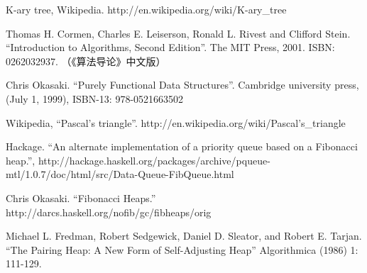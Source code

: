 \documentclass{ctexart}
\begin{document}

\ifx\wholebook\relax \else
\begin{thebibliography}{99}

K-ary tree, Wikipedia. http://en.wikipedia.org/wiki/K-ary\_tree

Thomas H. Cormen, Charles E. Leiserson, Ronald L. Rivest and Clifford Stein. ``Introduction to Algorithms, Second Edition''. The MIT Press, 2001. ISBN: 0262032937. （《算法导论》中文版）

Chris Okasaki. ``Purely Functional Data Structures''. Cambridge university press, (July 1, 1999), ISBN-13: 978-0521663502

Wikipedia, ``Pascal's triangle''. http://en.wikipedia.org/wiki/Pascal's\_triangle

Hackage. ``An alternate implementation of a priority queue based on a Fibonacci heap.'', http://hackage.haskell.org/packages/archive/pqueue-mtl/1.0.7/doc/html/src/Data-Queue-FibQueue.html

Chris Okasaki. ``Fibonacci Heaps.'' http://darcs.haskell.org/nofib/gc/fibheaps/orig

Michael L. Fredman, Robert Sedgewick, Daniel D. Sleator, and Robert E. Tarjan. ``The Pairing Heap: A New Form of Self-Adjusting Heap'' Algorithmica (1986) 1: 111-129.

\end{thebibliography}
\end{document}
